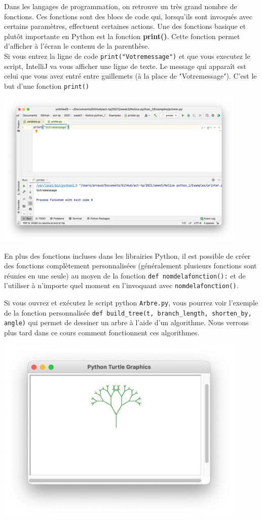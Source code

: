 Dans les langages de programmation, on retrouve un très grand nombre de fonctions. Ces fonctions sont des blocs de code qui, lorsqu'ils sont invoqués avec certains paramètres, effectuent certaines actions. Une des fonctions basique et plutôt importante en Python est la fonction \textbf{print()}.  Cette fonction permet d'afficher à l'écran le contenu de la parenthèse.\\ 
Si vous entrez la ligne de code \lstinline{print("Votremessage")} et que vous executez le script, IntelliJ va vous afficher une ligne de texte. Le message qui apparaît est celui que vous avez entré entre guillemets (à la place de "Votremessage"). C'est le but d'une fonction \lstinline{print()}
\begin{center}
\includegraphics[width=12cm]{8}	
\end{center}


En plus des fonctions incluses dans les librairies Python, il est possible de créer des fonctions complètement personnalisées (généralement plusieurs fonctions sont réunies en une seule) au moyen de la fonction \lstinline{def nomdelafonction():} et de l'utiliser à n'importe quel moment en l'invoquant avec \lstinline{nomdelafonction()}.

Si vous ouvrez et exécutez le script python \lstinline{Arbre.py}, vous pourrez voir l'exemple de la fonction personnalisée \lstinline{def build_tree(t, branch_length, shorten_by, angle)} qui permet de dessiner un arbre à l'aide d'un algorithme. Nous verrons plus tard dans ce cours comment fonctionnent ces algorithmes.

\begin{center}
\includegraphics[width=12cm]{arbre.png}		
\end{center}


